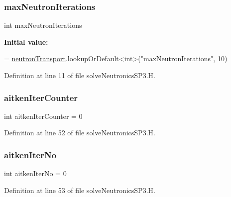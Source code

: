 \subsubsection{\texorpdfstring{max\+Neutron\+Iterations}{maxNeutronIterations}}
{\footnotesize\ttfamily int max\+Neutron\+Iterations}

{\bfseries Initial value\+:}
\begin{DoxyCode}
=
    \hyperlink{solveNeutronicsSP3_8H_ac82f3800c6fe7f00c65fbf04d3c1050d}{neutronTransport}.lookupOrDefault<\textcolor{keywordtype}{int}>(\textcolor{stringliteral}{"maxNeutronIterations"}, 10)
\end{DoxyCode}


Definition at line 11 of file solve\+Neutronics\+S\+P3.\+H.

\mbox{\label{solveNeutronicsSP3_8H_a99558413abb34d76245c07185d7117d4}} 
\subsubsection{\texorpdfstring{aitken\+Iter\+Counter}{aitkenIterCounter}}
{\footnotesize\ttfamily int aitken\+Iter\+Counter = 0}



Definition at line 52 of file solve\+Neutronics\+S\+P3.\+H.

\mbox{\label{solveNeutronicsSP3_8H_a0a1c3011c74baf349d41384de3b18ee3}} 
\subsubsection{\texorpdfstring{aitken\+Iter\+No}{aitkenIterNo}}
{\footnotesize\ttfamily int aitken\+Iter\+No = 0}



Definition at line 53 of file solve\+Neutronics\+S\+P3.\+H.

\mbox{\label{solveNeutronicsSP3_8H_a54b3011be8f08fc82447c253fd5ddfef}} 

